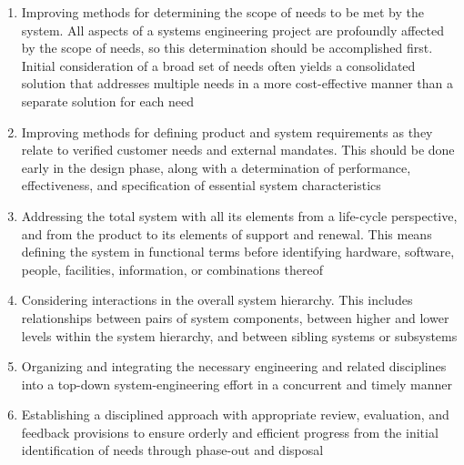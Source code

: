 \begin{enumerate}
	\item Improving methods for determining the scope of needs to be met by the system. All aspects of a systems engineering project are profoundly affected by the scope of needs, so this determination should be accomplished first. Initial consideration of a broad set of needs often yields a consolidated solution that addresses multiple needs in a more cost-effective manner than a separate solution for each need
	\item Improving methods for defining product and system requirements as they relate to verified customer needs and external mandates. This should be done early in the design phase, along with a determination of performance, effectiveness, and specification of essential system characteristics
	\item Addressing the total system with all its elements from a life-cycle perspective, and from the product to its elements of support and renewal. This means defining the system in functional terms before identifying hardware, software, people, facilities, information, or combinations thereof
	\item Considering interactions in the overall system hierarchy. This includes relationships between pairs of system components, between higher and lower levels within the system hierarchy, and between sibling systems or subsystems
	\item Organizing and integrating the necessary engineering and related disciplines into a top-down system-engineering effort in a concurrent and timely manner
	\item Establishing a disciplined approach with appropriate review, evaluation, and feedback provisions to ensure orderly and efficient progress from the initial identification of needs through phase-out and disposal
\end{enumerate}

